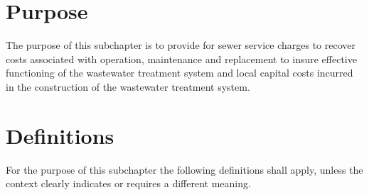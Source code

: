 
\setcounter{section}{54}
\section{Purpose}
The purpose of this subchapter is to provide for sewer service charges to recover costs associated with operation, maintenance and replacement to insure effective functioning of the wastewater treatment system and local capital costs incurred in the construction of the wastewater treatment system.

\section{Definitions}
For the purpose of this subchapter the following definitions shall apply, unless the context clearly indicates or requires a different meaning.
